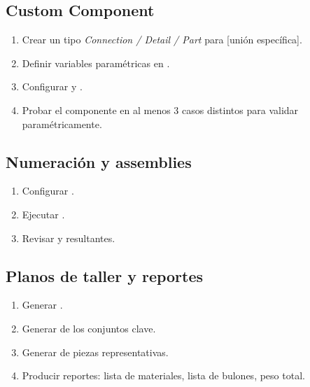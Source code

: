 \documentclass[11pt,a4paper]{article}
\begin{document}
\begin{comando}
\end{comando}

\subsection{Custom Component}
\begin{enumerate}
    \item Crear un  tipo \textit{Connection / Detail / Part} para [unión específica].
    \item Definir variables paramétricas en .
    \item Configurar  y .
    \item Probar el componente en al menos 3 casos distintos para validar paramétricamente.
\end{enumerate}

\begin{tip}
\end{tip}

\subsection{Numeración y assemblies}
\begin{enumerate}
    \item Configurar .
    \item Ejecutar .
    \item Revisar  y  resultantes.
\end{enumerate}

\subsection{Planos de taller y reportes}
\begin{enumerate}
    \item Generar .
    \item Generar  de los conjuntos clave.
    \item Generar  de piezas representativas.
    \item Producir reportes: lista de materiales, lista de bulones, peso total.
\end{enumerate}
\end{document}
